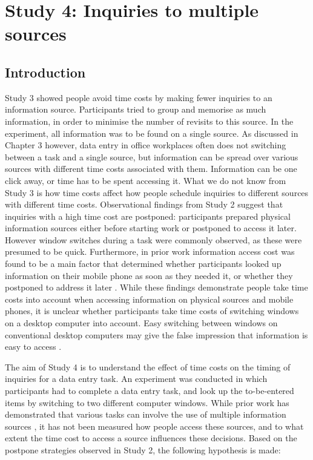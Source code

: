 
\section{Study 4: Inquiries to multiple sources}
 
\subsection{Introduction}

Study 3 showed people avoid time costs by making fewer inquiries to an information source. Participants tried to group and memorise as much information, in order to minimise the number of revisits to this source. In the experiment, all information was to be found on a single source. As discussed in Chapter 3 however, data entry in office workplaces often does not switching between a task and a single source, but information can be spread over various sources with different time costs associated with them. Information can be one click away, or time has to be spent accessing it. What we do not know from Study 3 is how time costs affect how people schedule inquiries to different sources with different time costs. Observational findings from Study 2 suggest that inquiries with a high time cost are postponed: participants prepared physical information sources either before starting work or postponed to access it later. However window switches during a task were commonly observed, as these were presumed to be quick. Furthermore, in prior work information access cost was found to be a main factor that determined whether participants looked up information on their mobile phone as soon as they needed it, or whether they postponed to address it later \citep{Sohn2008}. While these findings demonstrate people take time costs into account when accessing information on physical sources and mobile phones, it is unclear whether participants take time costs of switching windows on a desktop computer into account. Easy switching between windows on conventional desktop computers may give the false impression that information is easy to access \citep{Sellen2003}. 

The aim of Study 4 is to understand the effect of time costs on the timing of inquiries for a data entry task. An experiment was conducted in which participants had to complete a data entry task, and look up the to-be-entered items by switching to two different computer windows. While prior work has demonstrated that various tasks can involve the use of multiple information sources \citep{Cangiano2009, Murphy2016, Su2013}, it has not been measured how people access these sources, and to what extent the time cost to access a source influences these decisions. Based on the postpone strategies observed in Study 2, the following hypothesis is made:


